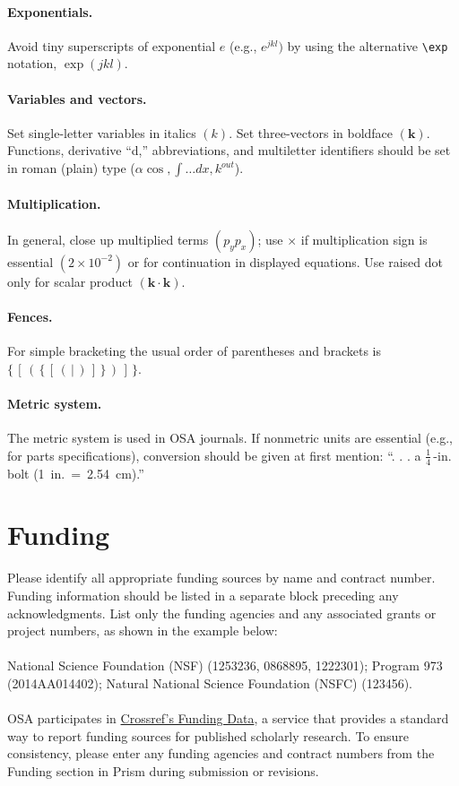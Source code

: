 \documentclass[10pt]{article}
\begin{document}
\paragraph*{\bfseries Exponentials.} Avoid tiny superscripts of exponential $e$ (e.g.,
$e^{jkl})$ by using the alternative \verb+\exp+ notation,
$\exp(jkl)$.

\paragraph*{\bfseries Variables and vectors.}
Set single-letter variables in italics $(k)$. Set three-vectors in
boldface $(\mathbf{k})$. Functions, derivative ``d,''
abbreviations, and multiletter identifiers should be set in roman
(plain) type  ($\alpha \cos, \int\!\dots{d}x, k^{out}$).

\paragraph*{\bfseries Multiplication.}
In general, close up multiplied terms $(p_yp_x)$;
use $\times$ if multiplication sign is essential $(2 \times
10^{-2})$ or for continuation in displayed equations. Use raised dot only for scalar product $(\mathbf{k \cdot k})$.

\paragraph*{\bfseries Fences.}
For simple bracketing the usual order of parentheses and brackets
is $\{ \, [  \, (  \,  \{  \, [  \, (  \, |  \, )  \, ]  \, \} \,
)  \, ]  \, \}$.


\paragraph*{\bfseries Metric system.}
The metric system is used in OSA journals. If nonmetric units are
essential (e.g., for parts specifications), conversion should be
given at first mention:  ``. . . a $\frac{1}{4}$\,-in. bolt \mbox{(1 in.
= 2.54 cm).''}

\section*{Funding}
Please identify all appropriate funding sources by name and contract number. Funding information should be listed in a separate block preceding any acknowledgments. List only the funding agencies and any associated grants or project numbers, as shown in the example below:\\
\\
National Science Foundation (NSF) (1253236, 0868895, 1222301); Program 973 (2014AA014402); Natural National Science Foundation (NSFC) (123456).\\
\\
OSA participates in \href{http://www.crossref.org/fundingdata/}{Crossref's Funding Data}, a service that provides a standard way to report funding sources for published scholarly research. To ensure consistency, please enter any funding agencies and contract numbers from the Funding section in Prism during submission or revisions.
\end{document}
